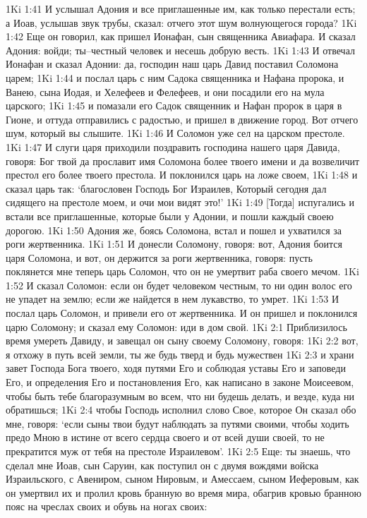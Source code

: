 1Ki 1:41  И услышал Адония и все приглашенные им, как только перестали есть; а Иоав, услышав звук трубы, сказал: отчего этот шум волнующегося города?
1Ki 1:42  Еще он говорил, как пришел Ионафан, сын священника Авиафара. И сказал Адония: войди; ты--честный человек и несешь добрую весть.
1Ki 1:43  И отвечал Ионафан и сказал Адонии: да, господин наш царь Давид поставил Соломона царем;
1Ki 1:44  и послал царь с ним Садока священника и Нафана пророка, и Ванею, сына Иодая, и Хелефеев и Фелефеев, и они посадили его на мула царского;
1Ki 1:45  и помазали его Садок священник и Нафан пророк в царя в Гионе, и оттуда отправились с радостью, и пришел в движение город. Вот отчего шум, который вы слышите.
1Ki 1:46  И Соломон уже сел на царском престоле.
1Ki 1:47  И слуги царя приходили поздравить господина нашего царя Давида, говоря: Бог твой да прославит имя Соломона более твоего имени и да возвеличит престол его более твоего престола. И поклонился царь на ложе своем,
1Ki 1:48  и сказал царь так: `благословен Господь Бог Израилев, Который сегодня дал сидящего на престоле моем, и очи мои видят это!'
1Ki 1:49  [Тогда] испугались и встали все приглашенные, которые были у Адонии, и пошли каждый своею дорогою.
1Ki 1:50  Адония же, боясь Соломона, встал и пошел и ухватился за роги жертвенника.
1Ki 1:51  И донесли Соломону, говоря: вот, Адония боится царя Соломона, и вот, он держится за роги жертвенника, говоря: пусть поклянется мне теперь царь Соломон, что он не умертвит раба своего мечом.
1Ki 1:52  И сказал Соломон: если он будет человеком честным, то ни один волос его не упадет на землю; если же найдется в нем лукавство, то умрет.
1Ki 1:53  И послал царь Соломон, и привели его от жертвенника. И он пришел и поклонился царю Соломону; и сказал ему Соломон: иди в дом свой.
1Ki 2:1  Приблизилось время умереть Давиду, и завещал он сыну своему Соломону, говоря:
1Ki 2:2  вот, я отхожу в путь всей земли, ты же будь тверд и будь мужествен
1Ki 2:3  и храни завет Господа Бога твоего, ходя путями Его и соблюдая уставы Его и заповеди Его, и определения Его и постановления Его, как написано в законе Моисеевом, чтобы быть тебе благоразумным во всем, что ни будешь делать, и везде, куда ни обратишься;
1Ki 2:4  чтобы Господь исполнил слово Свое, которое Он сказал обо мне, говоря: `если сыны твои будут наблюдать за путями своими, чтобы ходить предо Мною в истине от всего сердца своего и от всей души своей, то не прекратится муж от тебя на престоле Израилевом'.
1Ki 2:5  Еще: ты знаешь, что сделал мне Иоав, сын Саруин, как поступил он с двумя вождями войска Израильского, с Авениром, сыном Нировым, и Амессаем, сыном Иеферовым, как он умертвил их и пролил кровь бранную во время мира, обагрив кровью бранною пояс на чреслах своих и обувь на ногах своих:
